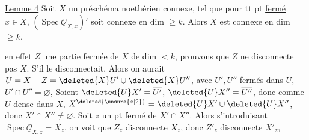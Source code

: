 
\uline{Lemme 4} Soit $X$ un préschéma noethérien connexe,  tel que pour tt pt \uline{fermé} $x\in X$, $(\operatorname{Spec}\underline{\mathcal O}_{X,x})'$ soit connexe en dim $\geq k$. Alors $X$ est connexe en dim $\geq k$.

  en effet  $Z$ une partie fermée de $X$ de dim $<k$, prouvons que $Z$ ne disconnecte pas $X$.  S'il le disconnectait, Alors on aurait $U=X-Z=\deleted{X}U'\cup\deleted{X}U''$, avec $U',U''$ fermés dans $U$, $U'\cap U''=\varnothing$, Soient $\deleted{U}X'=\overline{U'}$, $\deleted{U}X''=\overline{U''}$, donc comme $U$ dense
dans $X$, $X^{\deleted{\unsure{z|2}}}=\deleted{U}X'\cup\deleted{U}X''$, donc $X'\cap X''\ne\varnothing$.
Soit $z$ un pt fermé de $X'\cap X''$. Alors s'introduisant  $\operatorname{Spec}\underline{\mathcal O}_{X,z}=X_z$, on voit que $Z_z$ disconnecte $X_z$, donc $Z'_z$ disconnecte $X'_z$, 

